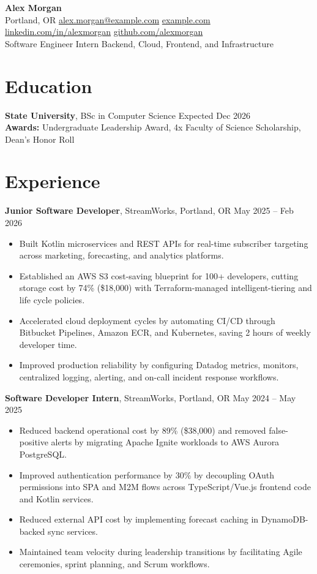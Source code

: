 \documentclass[10pt, letterpaper]{article}
\begin{document}
\begin{center}
    {\Large \textbf{Alex Morgan}}\\
    Portland, OR \textbar{}
    \href{mailto:alex.morgan@example.com}{alex.morgan@example.com} \textbar{}
    \href{https://example.com}{example.com} \textbar{}
    \href{https://linkedin.com/in/alexmorgan}{linkedin.com/in/alexmorgan} \textbar{}
    \href{https://github.com/alexmorgan}{github.com/alexmorgan}\\
    Software Engineer Intern \textbar{} Backend, Cloud, Frontend, and Infrastructure
\end{center}

\section{Education}
\textbf{State University}, BSc in Computer Science \hfill Expected Dec 2026\\
\textbf{Awards:} Undergraduate Leadership Award, 4x Faculty of Science Scholarship, Dean's Honor Roll

\section{Experience}
\textbf{Junior Software Developer}, StreamWorks, Portland, OR \hfill May 2025 -- Feb 2026
\begin{itemize}
    \item Built Kotlin microservices and REST APIs for real-time subscriber targeting across marketing, forecasting, and analytics platforms.
    \item Established an AWS S3 cost-saving blueprint for 100+ developers, cutting storage cost by 74\% (\$18,000) with Terraform-managed intelligent-tiering and life cycle policies.
    \item Accelerated cloud deployment cycles by automating CI/CD through Bitbucket Pipelines, Amazon ECR, and Kubernetes, saving 2 hours of weekly developer time.
    \item Improved production reliability by configuring Datadog metrics, monitors, centralized logging, alerting, and on-call incident response workflows.
\end{itemize}

\textbf{Software Developer Intern}, StreamWorks, Portland, OR \hfill May 2024 -- May 2025
\begin{itemize}
    \item Reduced backend operational cost by 89\% (\$38,000) and removed false-positive alerts by migrating Apache Ignite workloads to AWS Aurora PostgreSQL.
    \item Improved authentication performance by 30\% by decoupling OAuth permissions into SPA and M2M flows across TypeScript/Vue.js frontend code and Kotlin services.
    \item Reduced external API cost by implementing forecast caching in DynamoDB-backed sync services.
    \item Maintained team velocity during leadership transitions by facilitating Agile ceremonies, sprint planning, and Scrum workflows.
\end{itemize}
\end{document}
